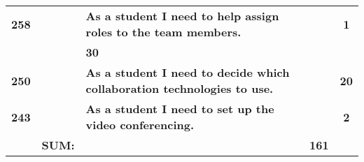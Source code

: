 \begin{table*}[!ht]
\begin{tabularx}{\textwidth}{ccXcc}
\textbf{258} 	&
	& \textbf{As a student I need to help assign roles to the team members.} 						& 			& \textbf{1} \\

						&  			& \textbf{30} \\
\textbf{250} 	&
	& \textbf{As a student I need to decide which collaboration technologies to use.} 						& 			& \textbf{20} \\
\textbf{243} 	&
	& \textbf{As a student I need to set up the video conferencing.} 						& 			& \textbf{2} \\
\midrule
				& \textbf{SUM:}		&			& \textbf{161}
 \\																			
\bottomrule[1mm]

\end{tabularx}
\end{table*}